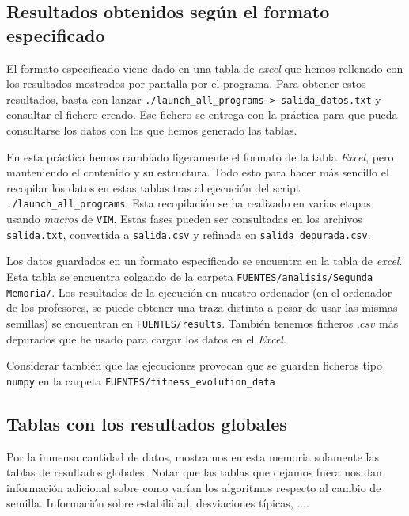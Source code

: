 \documentclass[11pt]{article}
\begin{document}
\pagebreak

\subsection{Resultados obtenidos según el formato especificado}

El formato especificado viene dado en una tabla de \emph{excel} que hemos rellenado con los resultados mostrados por pantalla por el programa. Para obtener estos resultados, basta con lanzar \lstinline{./launch_all_programs > salida_datos.txt} y consultar el fichero creado. Ese fichero se entrega con la práctica para que pueda consultarse los datos con los que hemos generado las tablas.

En esta práctica hemos cambiado ligeramente el formato de la tabla \emph{Excel}, pero manteniendo el contenido y su estructura. Todo esto para hacer más sencillo el recopilar los datos en estas tablas tras al ejecución del script \lstinline{./launch_all_programs}. Esta recopilación se ha realizado en varias etapas usando \emph{macros} de \lstinline{VIM}. Estas fases pueden ser consultadas en los archivos \lstinline{salida.txt}, convertida a \lstinline{salida.csv} y refinada en \lstinline{salida_depurada.csv}.

Los datos guardados en un formato especificado se encuentra en la tabla de \emph{excel}. Esta tabla se encuentra colgando de la carpeta \lstinline{FUENTES/analisis/Segunda Memoria/}. Los resultados de la ejecución en nuestro ordenador (en el ordenador de los profesores, se puede obtener una traza distinta a pesar de usar las mismas semillas) se encuentran en \lstinline{FUENTES/results}. También tenemos ficheros $.csv$ más depurados que he usado para cargar los datos en el \emph{Excel}.

Considerar también que las ejecuciones provocan que se guarden ficheros tipo \lstinline{numpy} en la carpeta \lstinline{FUENTES/fitness_evolution_data}

\subsection{Tablas con los resultados globales}

Por la inmensa cantidad de datos, mostramos en esta memoria solamente las tablas de resultados globales. Notar que las tablas que dejamos fuera nos dan información adicional sobre como varían los algoritmos respecto al cambio de semilla. Información sobre estabilidad, desviaciones típicas, $\ldots$.
\end{document}
